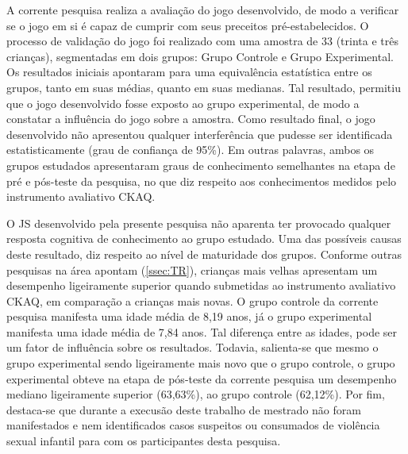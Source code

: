 A corrente pesquisa realiza a avaliação do jogo desenvolvido, de modo a verificar se o jogo em si é capaz de cumprir com seus preceitos pré-estabelecidos. O processo de validação do jogo foi realizado com uma amostra de 33 (trinta e três crianças), segmentadas em dois grupos: Grupo Controle e Grupo Experimental. Os resultados iniciais apontaram para uma equivalência estatística entre os grupos, tanto em suas médias, quanto em suas medianas. Tal resultado, permitiu que o jogo desenvolvido fosse exposto ao grupo experimental, de modo a constatar a influência do jogo sobre a amostra. Como resultado final, o jogo desenvolvido não apresentou qualquer interferência que pudesse ser identificada estatisticamente (grau de confiança de 95\%). Em outras palavras, ambos os grupos estudados apresentaram graus de conhecimento semelhantes na etapa de pré e pós-teste da pesquisa, no que diz respeito aos conhecimentos medidos pelo instrumento avaliativo \ac{CKAQ}.

 
O \acf{JS} desenvolvido pela presente pesquisa não aparenta ter provocado qualquer resposta cognitiva de conhecimento ao grupo estudado. Uma das possíveis causas deste resultado, diz respeito ao nível de maturidade dos grupos. Conforme outras pesquisas na área apontam (\autoref{ssec:TR}), crianças mais velhas apresentam um desempenho ligeiramente superior quando submetidas ao instrumento avaliativo \ac{CKAQ}, em comparação a crianças mais novas. O grupo controle da corrente pesquisa manifesta uma idade média de 8,19 anos, já o grupo experimental manifesta uma idade média de 7,84 anos. Tal diferença entre as idades, pode ser um fator de influência sobre os resultados. Todavia, salienta-se que mesmo o grupo experimental sendo ligeiramente  mais novo que o grupo controle, o grupo experimental obteve na etapa de pós-teste da corrente pesquisa um desempenho mediano ligeiramente  superior (63,63\%), ao grupo controle (62,12\%). Por fim, destaca-se que durante a execusão deste trabalho de mestrado não foram manifestados e nem identificados casos suspeitos ou consumados de violência sexual infantil para com os participantes desta pesquisa.  

